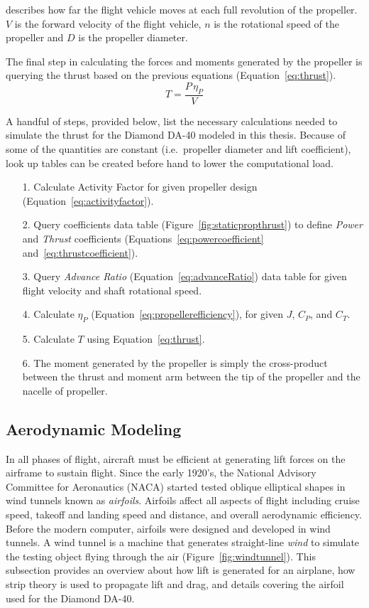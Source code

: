 \documentclass[12pt]{report}
\begin{document}
describes how far the flight vehicle moves at each full revolution of the propeller.
\(V\) is the forward velocity of the flight vehicle, \(n\) is the rotational speed of the propeller and \(D\) is the propeller diameter.

The final step in calculating the forces and moments generated by the propeller is querying the thrust based on the previous equations (Equation~\ref{eq:thrust}).
\begin{equation}\label{eq:thrust}
  T = \frac{P \, \eta_P}{V}
\end{equation}

A handful of steps, provided below, list the necessary calculations needed to simulate the thrust for the Diamond DA-40 modeled in this thesis. Because of some of the quantities are constant (i.e.\ propeller diameter and lift coefficient), look up tables can be created before hand to lower the computational load.

\begin{itemize}
  \item[1.] Calculate Activity Factor for given propeller design (Equation~\ref{eq:activityfactor}).
  \item[2.] Query coefficients data table (Figure~\ref{fig:staticpropthrust}) to define \textit{Power} and \textit{Thrust} coefficients (Equations~\ref{eq:powercoefficient} and~\ref{eq:thrustcoefficient}).
  \item[3.] Query \textit{Advance Ratio} (Equation~\ref{eq:advanceRatio}) data table for given flight velocity and shaft rotational speed.
  \item[4.] Calculate \( \eta_P \) (Equation~\ref{eq:propellerefficiency}), for given \(J\), \(C_P\), and \(C_T\).
  \item[5.] Calculate \(T\) using Equation~\ref{eq:thrust}.
  \item[6.] The moment generated by the propeller is simply the cross-product between the thrust and moment arm between the tip of the propeller and the nacelle of propeller.
\end{itemize}

\subsection{Aerodynamic Modeling}\label{section:aerodynamic}
In all phases of flight, aircraft must be efficient at generating lift forces on the airframe to sustain flight. Since the early 1920's, the National Advisory Committee for Aeronautics (NACA) started tested oblique elliptical shapes in wind tunnels known as \textit{airfoils}. Airfoils affect all aspects of flight including cruise speed, takeoff and landing speed and distance, and overall aerodynamic efficiency. Before the modern computer, airfoils were designed and developed in wind tunnels. A wind tunnel is a machine that generates straight-line \textit{wind} to simulate the testing object flying through the air (Figure~\ref{fig:windtunnel}). This subsection provides an overview about how lift is generated for an airplane, how strip theory is used to propagate lift and drag, and details covering the airfoil used for the Diamond DA-40.
\end{document}
